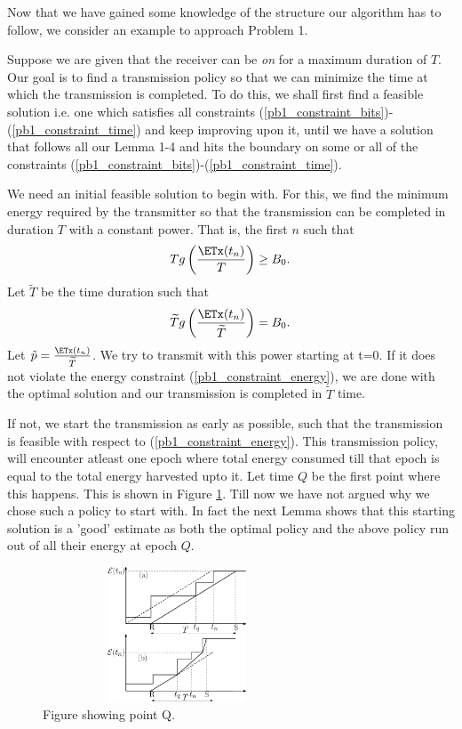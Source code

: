 Now that we have gained some knowledge of the structure our algorithm has to follow, we consider an example to approach Problem 1. 

Suppose we are given that the receiver can be \textit{on} for a maximum duration of $T$. Our goal is to find a transmission policy so that we can minimize the time at which the transmission is completed. To do this, we shall first find a feasible solution i.e. one which satisfies all constraints (\ref{pb1_constraint_bits})-(\ref{pb1_constraint_time}) and keep improving upon it, until we have a solution that follows all our Lemma 1-4 and hits the boundary on some or all of the constraints (\ref{pb1_constraint_bits})-(\ref{pb1_constraint_time}). 

We need an initial feasible solution to begin with. For this, we find the minimum energy required by the transmitter so that the transmission can be completed in duration $T$ with a constant power. That is, the first $n$ such that
\begin{equation}
T g\left(\frac{\ETx(t_n)}{T}\right)\geq B_0.
\end{equation}
Let $\widetilde{T}$ be the time duration such that
\begin{equation}
\widetilde{T}g\left(\frac{\ETx(t_n)}{\widetilde{T}}\right)=B_0.
\end{equation}
Let $\tilde{p}=\frac{\ETx(t_n)}{\widetilde{T}}$. We try to transmit with this power starting at t=0. If it does not violate the energy constraint (\ref{pb1_constraint_energy}), we are done with the optimal solution and our transmission is completed in $\widetilde{T}$ time.

If not, we start the transmission as early as possible, such that the transmission is feasible with respect to (\ref{pb1_constraint_energy}). This transmission policy, will encounter atleast one epoch where total energy consumed till that epoch is equal to the total energy harvested upto it. Let time $Q$ be the first point where this happens. This is shown in Figure \ref{straight}. Till now we have not argued why we chose such a policy to start with. In fact the next Lemma shows that this starting solution is a 'good' estimate as both the optimal policy and the above policy run out of all their energy at epoch $Q$.

\begin{figure}
\label{straight}
\centering
  \centerline{\includegraphics[width=8cm,height=4cm]{straight.eps}}
\caption{Figure showing point Q.}
\end{figure}

